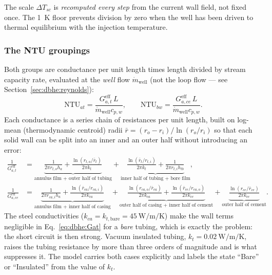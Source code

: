 The scale $\Delta T_{sc}$ is \emph{recomputed every step} from the current wall
field, not fixed once. The \SI{1}{\kelvin} floor prevents division by zero when
the well has been driven to thermal equilibrium with the injection temperature.

\subsubsection{The NTU groupings}
Both groups are conductance per unit length times length divided by stream
capacity rate, evaluated at the \emph{well} flow $\dot m_{\mathrm{well}}$ (not
the loop flow --- see Section~\ref{sec:dbhe:reynolds}):
\begin{equation}
\mathrm{NTU}_{at}=\frac{G_{a,t}^{\mathrm{eff}}\,L}{\dot m_{\mathrm{well}}c_{p,w}}, \qquad
\mathrm{NTU}_{bw}=\frac{G_{a,ce}^{\mathrm{eff}}\,L}{\dot m_{\mathrm{well}}c_{p,w}} .
\label{eq:dbhe:NTUdef}
\end{equation}
Each conductance is a series chain of resistances per unit length, built on
log-mean (thermodynamic centroid) radii
$\bar r=(r_o-r_i)/\ln(r_o/r_i)$ so that each solid wall can be split into an
inner and an outer half without introducing an error:
\begin{align}
\frac{1}{G_{a,t}^{\mathrm{eff}}} &=\underbrace{\frac{1}{2\pi
r_{t,o}h_a}+\frac{\ln(r_{t,o}/\bar r_t)}{2\pi k_t}}_{\text{annulus film + outer half of
tubing}} +\underbrace{\frac{\ln(\bar r_t/r_{t,i})}{2\pi k_t}+\frac{1}{2\pi
r_{t,i}h_{tb}}}_{\text{inner half of tubing + bore film}},
\label{eq:dbhe:Gat}\\[4pt]
\frac{1}{G_{a,ce}^{\mathrm{eff}}} &=\underbrace{\frac{1}{2\pi r_{ca,i}h_a}+\frac{\ln(\bar
r_{ca}/r_{ca,i})}{2\pi k_{ca}}}_{\text{annulus film + inner half of casing}}
+\underbrace{\frac{\ln(r_{ca,o}/\bar r_{ca})}{2\pi k_{ca}}+\frac{\ln(\bar
r_{ce}/r_{ca,o})}{2\pi k_{ce}}}_{\text{outer half of casing + inner half of cement}}
+\underbrace{\frac{\ln(r_{ce}/\bar r_{ce})}{2\pi k_{ce}}}_{\text{outer half of cement}} .
\label{eq:dbhe:Gace}
\end{align}
The steel conductivities ($k_{ca}=k_{t,\mathrm{bare}}=\SI{45}{\watt\per\metre\per\kelvin}$)
make the wall terms negligible in Eq.~\eqref{eq:dbhe:Gat} for a \emph{bare}
tubing, which is exactly the problem: the short circuit is then strong. Vacuum
insulated tubing, $k_t=\SI{0.02}{\watt\per\metre\per\kelvin}$, raises the tubing
resistance by more than three orders of magnitude and is what suppresses it. The
model carries both cases explicitly and labels the state ``Bare'' or
``Insulated'' from the value of $k_t$.

